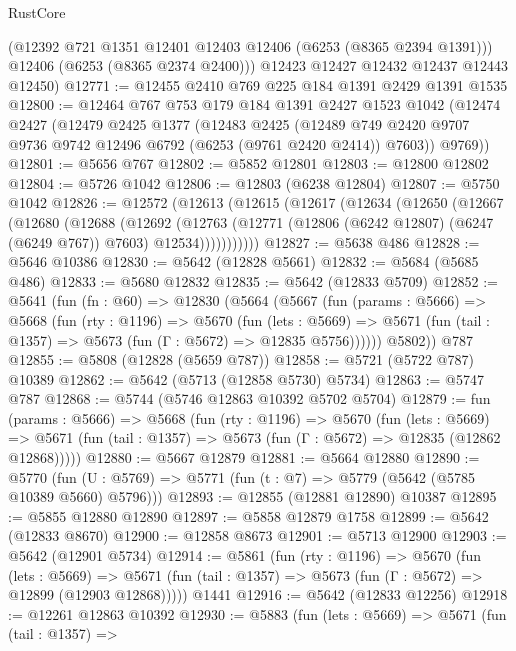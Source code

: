 \begin{lexlean}{RustCore}
\begin{coremodule}
        (@12392 @721 @1351 @12401 @12403 @12406 (@6253 (@8365 @2394 @1391)))
        @12406
        (@6253 (@8365 @2374 @2400)))
      @12423
      @12427
      @12432
      @12437
      @12443
      @12450)
@12771 := @12455 @2410 @769 @225 @184 @1391 @2429 @1391 @1535
@12800 := @12464
    @767
    @753
    @179
    @184
    @1391
    @2427
    @1523
    @1042
    (@12474
      @2427
      (@12479
        @2425
        @1377
        (@12483
          @2425
          (@12489 @749 @2420 @9707 @9736 @9742 @12496 @6792 (@6253 (@9761 @2420 @2414)) @7603))
        @9769))
@12801 := @5656 @767
@12802 := @5852 @12801
@12803 := @12800 @12802
@12804 := @5726 @1042
@12806 := @12803 (@6238 @12804)
@12807 := @5750 @1042
@12826 := @12572
    (@12613
      (@12615
        (@12617
          (@12634
            (@12650
              (@12667
                (@12680
                  (@12688
                    (@12692
                      (@12763
                        (@12771 (@12806 (@6242 @12807) (@6247 (@6249 @767)) @7603) @12534)))))))))))
@12827 := @5638 @486
@12828 := @5646 @10386
@12830 := @5642 (@12828 @5661)
@12832 := @5684 (@5685 @486)
@12833 := @5680 @12832
@12835 := @5642 (@12833 @5709)
@12852 := @5641
    (fun (fn : @60) =>
    @12830
      (@5664
        (@5667
          (fun (params : @5666) =>
          @5668
            (fun (rty : @1196) =>
            @5670
              (fun (lets : @5669) =>
              @5671 (fun (tail : @1357) => @5673 (fun (Γ : @5672) => @12835 @5756))))))
        @5802))
    @787
@12855 := @5808 (@12828 (@5659 @787))
@12858 := @5721 (@5722 @787) @10389
@12862 := @5642 (@5713 (@12858 @5730) @5734)
@12863 := @5747 @787
@12868 := @5744 (@5746 @12863 @10392 @5702 @5704)
@12879 := fun (params : @5666) =>
  @5668
    (fun (rty : @1196) =>
    @5670
      (fun (lets : @5669) =>
      @5671 (fun (tail : @1357) => @5673 (fun (Γ : @5672) => @12835 (@12862 @12868)))))
@12880 := @5667 @12879
@12881 := @5664 @12880
@12890 := @5770
    (fun (U : @5769) => @5771 (fun (t : @7) => @5779 (@5642 (@5785 @10389 @5660) @5796)))
@12893 := @12855 (@12881 @12890) @10387
@12895 := @5855 @12880 @12890
@12897 := @5858 @12879 @1758
@12899 := @5642 (@12833 @8670)
@12900 := @12858 @8673
@12901 := @5713 @12900
@12903 := @5642 (@12901 @5734)
@12914 := @5861
    (fun (rty : @1196) =>
    @5670
      (fun (lets : @5669) =>
      @5671 (fun (tail : @1357) => @5673 (fun (Γ : @5672) => @12899 (@12903 @12868)))))
    @1441
@12916 := @5642 (@12833 @12256)
@12918 := @12261 @12863 @10392
@12930 := @5883
    (fun (lets : @5669) =>
    @5671
      (fun (tail : @1357) =>

\end{coremodule}
\end{lexlean}
